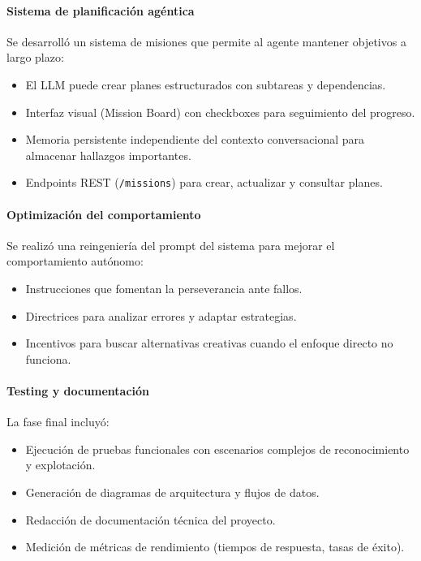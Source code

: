 \documentclass[12pt,a4paper]{article}
\begin{document}
\paragraph{Sistema de planificación agéntica}

Se desarrolló un sistema de misiones que permite al agente mantener objetivos a largo plazo:

\begin{itemize}
    \item El LLM puede crear planes estructurados con subtareas y dependencias.
    \item Interfaz visual (Mission Board) con checkboxes para seguimiento del progreso.
    \item Memoria persistente independiente del contexto conversacional para almacenar hallazgos importantes.
    \item Endpoints REST (\texttt{/missions}) para crear, actualizar y consultar planes.
\end{itemize}

\paragraph{Optimización del comportamiento}

Se realizó una reingeniería del prompt del sistema para mejorar el comportamiento autónomo:

\begin{itemize}
    \item Instrucciones que fomentan la perseverancia ante fallos.
    \item Directrices para analizar errores y adaptar estrategias.
    \item Incentivos para buscar alternativas creativas cuando el enfoque directo no funciona.
\end{itemize}

\paragraph{Testing y documentación}

La fase final incluyó:

\begin{itemize}
    \item Ejecución de pruebas funcionales con escenarios complejos de reconocimiento y explotación.
    \item Generación de diagramas de arquitectura y flujos de datos.
    \item Redacción de documentación técnica del proyecto.
    \item Medición de métricas de rendimiento (tiempos de respuesta, tasas de éxito).
\end{itemize}
\end{document}
